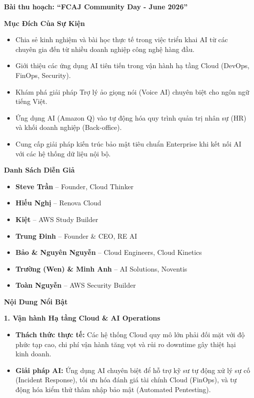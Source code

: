 \vspace{0.5em}\noindent\textbf{Bài thu hoạch: ``FCAJ Community Day - June 2026''}

\vspace{0.5em}\noindent\textbf{Mục Đích Của Sự Kiện}

\begin{itemize}
\tightlist
\item
  Chia sẻ kinh nghiệm và bài học thực tế trong việc triển khai AI từ các
  chuyên gia đến từ nhiều doanh nghiệp công nghệ hàng đầu.
\item
  Giới thiệu các ứng dụng AI tiên tiến trong vận hành hạ tầng Cloud
  (DevOps, FinOps, Security).
\item
  Khám phá giải pháp Trợ lý ảo giọng nói (Voice AI) chuyên biệt cho ngôn
  ngữ tiếng Việt.
\item
  Ứng dụng AI (Amazon Q) vào tự động hóa quy trình quản trị nhân sự (HR)
  và khối doanh nghiệp (Back-office).
\item
  Cung cấp giải pháp kiến trúc bảo mật tiêu chuẩn Enterprise khi kết nối
  AI với các hệ thống dữ liệu nội bộ.
\end{itemize}

\vspace{0.5em}\noindent\textbf{Danh Sách Diễn Giả}

\begin{itemize}
\tightlist
\item
  \textbf{Steve Trần} -- Founder, Cloud Thinker
\item
  \textbf{Hiếu Nghị} -- Renova Cloud
\item
  \textbf{Kiệt} -- AWS Study Builder
\item
  \textbf{Trung Đinh} -- Founder \& CEO, RE AI
\item
  \textbf{Bảo \& Nguyên Nguyễn} -- Cloud Engineers, Cloud Kinetics
\item
  \textbf{Trường (Wen) \& Minh Anh} -- AI Solutions, Noventis
\item
  \textbf{Toàn Nguyễn} -- AWS Security Builder
\end{itemize}

\vspace{0.5em}\noindent\textbf{Nội Dung Nổi Bật}

\vspace{0.5em}\noindent\textbf{1. Vận hành Hạ tầng Cloud \& AI Operations}

\begin{itemize}
\tightlist
\item
  \textbf{Thách thức thực tế:} Các hệ thống Cloud quy mô lớn phải đối
  mặt với độ phức tạp cao, chi phí vận hành tăng vọt và rủi ro downtime
  gây thiệt hại kinh doanh.
\item
  \textbf{Giải pháp AI:} Ứng dụng AI chuyên biệt để hỗ trợ kỹ sư tự động
  xử lý sự cố (Incident Response), tối ưu hóa đánh giá tài chính Cloud
  (FinOps), và tự động hóa kiểm thử thâm nhập bảo mật (Automated
  Pentesting).
\end{itemize}

